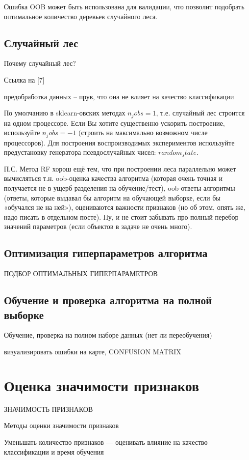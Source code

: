 \documentclass[14pt, a4paper, oneside]{extarticle}
\begin{document}
Ошибка OOB может быть использована для валидации, что позволит подобрать оптимальное количество деревьев случайного леса.

\subsection{Случайный лес}
Почему случайный лес?

Ссылка на [7]

предобработка данных -- прув, что она не влияет на качество классификации

По умолчанию в sklearn-овских методах $n_jobs=1$, т.е. случайный лес строится на одном процессоре. Если Вы хотите существенно ускорить построение, используйте $n_jobs=-1$ (строить на максимально возможном числе процессоров). Для построения воспроизводимых экспериментов используйте предустановку генератора псевдослучайных чисел: $random_state$.

П.С. Метод RF хорош ещё тем, что при построении леса параллельно может вычисляться т.н. oob-оценка качества алгоритма (которая очень точная и получается не в ущерб разделения на обучение/тест), oob-ответы алгоритмы (ответы, которые выдавал бы алгоритм на обучающей выборке, если бы «обучался не на ней»), оцениваются важности признаков (но об этом, опять же, надо писать в отдельном посте). Ну, и не стоит забывать про полный перебор значений параметров (если объектов в задаче не очень много).

\subsection{Оптимизация гиперпараметров алгоритма}
ПОДБОР ОПТИМАЛЬНЫХ ГИПЕРПАРАМЕТРОВ

\subsection{Обучение и проверка алгоритма на полной выборке}
Обучение, проверка на полном наборе данных (нет ли переобучения)

визуализировать ошибки на карте, CONFUSION MATRIX
\newpage

\section{Оценка значимости признаков}
ЗНАЧИМОСТЬ ПРИЗНАКОВ

Методы оценки значимости признаков

Уменьшать количество признаков --- оценивать влияние на качество классификации и время обучения
\newpage
\end{document}

